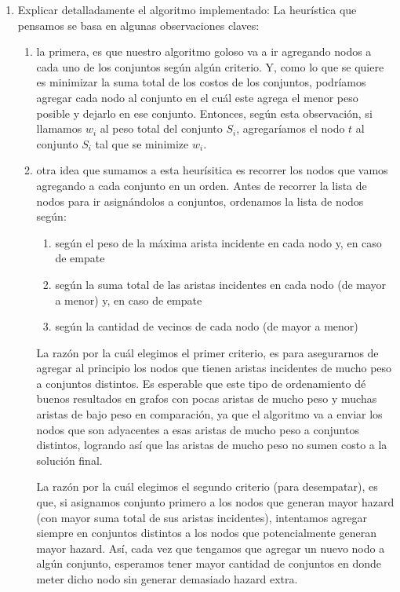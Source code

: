 \documentclass[11pt, a4paper, twoside]{article}
\begin{document}
    \begin{enumerate}
		\item Explicar detalladamente el algoritmo implementado:
		La heurística que pensamos se basa en algunas observaciones claves: 
		\begin{enumerate}
			\item la primera, es que nuestro
			algoritmo goloso va a ir agregando nodos a cada uno de los conjuntos según algún criterio. Y,
			como lo que se quiere es minimizar la suma total de los costos de los conjuntos, podríamos agregar
			cada nodo al conjunto en el cuál este agrega el menor peso posible y dejarlo en ese conjunto. 
			Entonces, según esta observación,
			si llamamos $w_{i}$ al peso total del conjunto $S_{i}$, 
			agregaríamos el nodo $t$ al conjunto $S_{i}$ tal que se minimize $w_{i}$.
						
			\item otra idea que sumamos a esta heurísitica es recorrer los nodos que vamos agregando a
			cada conjunto en un orden. Antes de recorrer la lista de nodos para ir asignándolos a conjuntos,
			ordenamos la lista de nodos según: 
			\begin{enumerate}
				\item según el peso de la máxima arista incidente en cada nodo y, en caso de empate
				\item según la suma total de las aristas incidentes en cada nodo (de mayor a menor) y, en caso de empate
				\item según la cantidad de vecinos de cada nodo (de mayor a menor)
			\end{enumerate}
			La razón por la cuál elegimos el primer criterio, es para asegurarnos de agregar al principio los nodos
			que tienen aristas incidentes de mucho peso a conjuntos distintos.
			Es esperable que este tipo de ordenamiento dé buenos resultados en grafos con pocas aristas de mucho
			peso y muchas aristas de bajo peso en comparación, ya que el algoritmo va a enviar los nodos 
			que son adyacentes a esas aristas de mucho peso a conjuntos distintos, logrando así que las aristas de
			mucho peso no sumen costo a la solución final.
			
			La razón por la cuál elegimos el segundo criterio (para desempatar), es que, si asignamos conjunto
			primero a los nodos que generan mayor hazard (con mayor suma total de sus aristas incidentes), intentamos
			agregar siempre en conjuntos distintos a los nodos que potencialmente generan mayor hazard. Así, cada vez que 
			tengamos que agregar un nuevo nodo a algún conjunto, esperamos tener mayor cantidad de conjuntos en donde 
			meter dicho nodo sin generar demasiado hazard extra.
			

\end{enumerate}
\end{enumerate}
\end{document}
